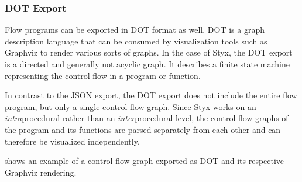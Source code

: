 \subsubsection{DOT Export}
\label{sec:dot-export}

Flow programs can be exported in DOT \cite{dot-language} format as well. DOT is a graph description language that can be consumed by visualization tools such as Graphviz \cite{graphviz} to render various sorts of graphs. In the case of Styx, the DOT export is a directed and generally not acyclic graph. It describes a finite state machine representing the control flow in a program or function.

In contrast to the JSON export, the DOT export does not include the entire flow program, but only a single control flow graph. Since Styx works on an \textit{intra}procedural rather than an \textit{inter}procedural level, the control flow graphs of the program and its functions are parsed separately from each other and can therefore be visualized independently.

 shows an example of a control flow graph exported as DOT and its respective Graphviz rendering.
